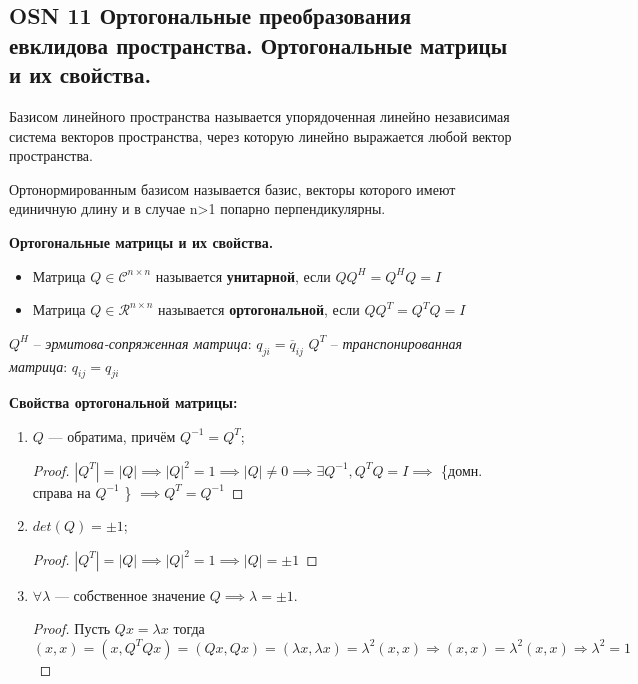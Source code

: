 \subsection{OSN 11 Ортогональные преобразования евклидова пространства. Ортогональные матрицы и их свойства.}

Базисом линейного пространства называется упорядоченная линейно независимая система векторов пространства, через которую линейно выражается любой вектор пространства. 

Ортонормированным базисом называется
базис, векторы которого имеют единичную длину и в случае n>1 попарно перпендикулярны. 

\textbf{Ортогональные матрицы и их свойства.}
\begin{itemize}
    \item Матрица $Q \in \mathcal{C}^{n \times n}$ называется \textbf{унитарной}, если \newline $QQ^H = Q^HQ=I$
    \item Матрица $Q \in \mathcal{R}^{n \times n}$ называется \textbf{ортогональной}, если \newline $QQ^T = Q^TQ=I$
 
\end{itemize}   

$Q^H$ -- \textit{эрмитова-сопряженная матрица}: $q_{ji} = \overline{q}_{ij}$   \newline
$Q^T$ -- \textit{транспонированная матрица}: $q_{ij} = q_{ji}$

\textbf{Свойства ортогональной матрицы:}
    \begin{enumerate}
        \item $Q$ --- обратима, причём $Q^{-1}=Q^T$;
        
        \begin{proof}
        $\left|Q^T\right|=\left|Q\right| \implies \left|Q\right|^2 = 1 \implies \left|Q\right| \neq 0 \implies \exists Q^{-1}, Q^TQ=I \implies$ \{домн. справа на $Q^{-1}$ \} $\implies Q^T=Q^{-1}$
        \end{proof}
        
        \item $det(Q) = \pm1$;
        
        \begin{proof}
        $\left|Q^T\right|=\left|Q\right| \implies \left|Q\right|^2 = 1 \implies \left|Q\right| = \pm 1$
        \end{proof}
        
        \item $\forall \lambda$ --- собственное значение $Q\implies \lambda=\pm1$.
        \begin{proof}
        Пусть $Qx=\lambda x$ тогда $(x,x)=(x,Q^TQx) = (Qx,Qx) = (\lambda x,\lambda x) = \lambda^2(x,x) \Rightarrow (x,x) = \lambda^2(x,x) \Rightarrow \lambda^2 = 1$

        \end{proof}
    \end{enumerate}
 
